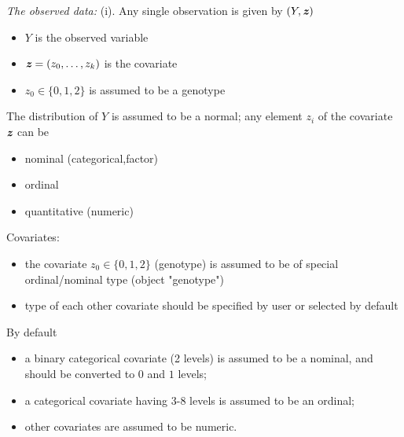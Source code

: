 \documentclass[11pt]{article}
\begin{document}
\noindent
{\it The observed data:} (i). Any single observation is given by $(Y,\mbox{\textbf{\textit z}})$\vspace{-2mm}
\begin{itemize}
\setlength\itemsep{-0.5em}
\item[]
 $Y$ is the observed variable
\item[]
$\mbox{\textbf{\textit z}}=(z_0,\ldots,z_k)$ is  the covariate
\item[]
$z_0\in\{0,1,2\}$ is assumed to be a genotype
\end{itemize} 
The distribution of $Y$ is assumed to be a normal; any element $z_i$ of the covariate $\mbox{\textbf{\textit z}}$ can be\vspace{-2mm}
\begin{itemize}
\setlength\itemsep{-0.5em}
\item[]
nominal (categorical,factor)
\item[]
ordinal 
\item[]
quantitative (numeric)
\end{itemize} 
Covariates:\vspace{-3mm}
\begin{itemize}
\setlength\itemsep{-0.5em}
\item[]
the covariate $z_0\in \{0,1,2\}$ (genotype) is assumed to be of special ordinal/nominal type (object "genotype")
\item[]
type of each other covariate should be specified by user or selected by default
\end{itemize} 
By default\vspace{-3mm}
\begin{itemize}
\setlength\itemsep{-0.5em}
\item[]
a binary categorical covariate (2 levels) is assumed to be a nominal, and should be converted to $0$ and $1$ levels;
\item[]
a categorical covariate having 3-8 levels is assumed to be an ordinal;
\item[]
other covariates are assumed to be numeric.
\end{itemize}
\end{document}
